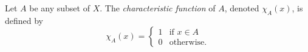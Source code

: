Let $A$ be any subset of $X$. The \textit{characteristic function} of $A$, denoted $\chi_A(x)$, is defined by
$$\chi_A(x) = \begin{cases} 1 & \text{if } x \in A \\ 0 & \text{otherwise.} \end{cases}$$
